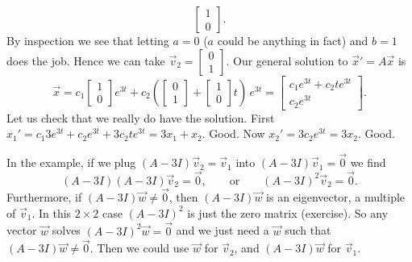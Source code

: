 \documentclass{ximera}
\begin{document}
\begin{example}
\begin{equation*}
\begin{bmatrix}
            1 \\ 
            0
        \end{bmatrix} .
    \end{equation*}
    By inspection we see that letting $a=0$ ($a$ could be anything in fact) and $b=1$ does the job.  Hence we can take $\vec{v}_2 = \left[ \begin{smallmatrix} 0 \\ 1 \end{smallmatrix} \right]$.  Our general solution to ${\vec{x}}' = A\vec{x}$ is
    \begin{equation*}
        \vec{x} = c_1 
        \begin{bmatrix}
            1 \\ 
            0
        \end{bmatrix}
        e^{3t} + c_2 \left(
        \begin{bmatrix}
            0 \\ 
            1
        \end{bmatrix}
        +
        \begin{bmatrix}
            1 \\ 
            0
        \end{bmatrix}
        t \right) \, e^{3t} =
        \begin{bmatrix}
            c_1 e^{3t}+c_2 te^{3t} \\
            c_2 e^{3t}
        \end{bmatrix} .
    \end{equation*}
    Let us check that we really do have the solution.  First $x_1' = c_1 3 e^{3t}+c_2 e^{3t} + 3 c_2 te^{3t} = 3 x_1 + x_2$.  Good.  Now $x_2' = 3 c_2 e^{3t} = 3x_2$.  Good.
\end{example}

In the example, if we plug $(A-3I)\vec{v}_2 = \vec{v}_1$ into $(A-3I)\vec{v}_1 = \vec{0}$ we find
\begin{equation*}
    (A-3I)(A-3I) \vec{v}_2 = \vec{0}, \qquad \text{or} \qquad {(A-3I)}^2\vec{v}_2 = \vec{0}.
\end{equation*}
Furthermore, if  $(A-3I) \vec{w} \not= \vec{0}$, then  $(A-3I) \vec{w}$ is an eigenvector, a multiple of $\vec{v}_1$. In this $2 \times 2$ case ${(A-3I)}^2$ is just the zero matrix (exercise). So any vector $\vec{w}$ solves ${(A-3I)}^2\vec{w} = \vec{0}$ and we just need a $\vec{w}$ such that $(A-3I)\vec{w} \not= \vec{0}$.  Then we could use $\vec{w}$ for $\vec{v}_2$, and $(A-3I)\vec{w}$ for $\vec{v}_1$.
\end{document}
